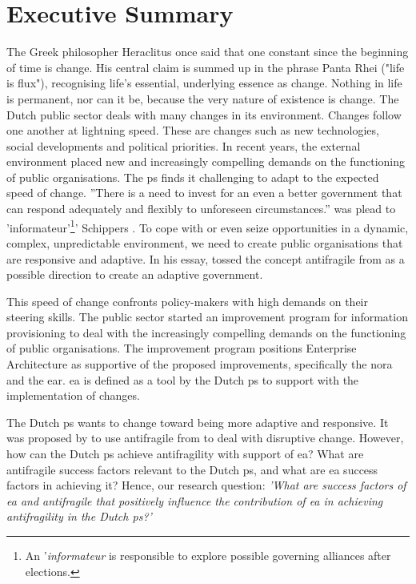 \chapter*{Executive Summary}
\label{executivesummary}
The Greek philosopher Heraclitus once said that one constant since the beginning of time is change. His central claim is summed up in the phrase Panta Rhei ("life is flux"), recognising life's essential, underlying essence as change. Nothing in life is permanent, nor can it be, because the very nature of existence is change. The Dutch public sector deals with many changes in its environment. Changes follow one another at lightning speed. These are changes such as new technologies, social developments and political priorities. In recent years, the external environment placed new and increasingly compelling demands on the functioning of public organisations. The \gls{ps} finds it challenging to adapt to the expected speed of change. ''There is a need to invest for an even a better government that can respond adequately and flexibly to unforeseen circumstances.'' was plead to 'informateur'\footnote{An '\textit{informateur} is responsible to explore possible governing alliances after elections.}' Schippers \parencite{Secretarissen-generaal2018}. To cope with or even seize opportunities in a dynamic, complex, unpredictable environment, we need to create public organisations that are responsive and adaptive. In his essay, \textcite[p.~79]{Steen2018} tossed the concept \gls{antifragile} from \textcite{Taleb2012} as a possible direction to create an adaptive government.

This speed of change confronts policy-makers with high demands on their steering skills. The public sector started an improvement program for information provisioning to deal with the increasingly compelling demands on the functioning of public organisations. The improvement program positions Enterprise Architecture as supportive of the proposed improvements, specifically the \acrfull{nora} and the \acrfull{ear}. \gls{ea} is defined as a tool by the Dutch \gls{ps} to support with the implementation of changes.

The Dutch \gls{ps} wants to change toward being more adaptive and responsive. It was proposed by \textcite{Steen2018} to use \gls{antifragile} from \textcite{Taleb2012} to deal with disruptive change.  However, how can the Dutch \gls{ps} achieve \gls{antifragility} with support of \gls{ea}? What are \gls{antifragile} success factors relevant to the Dutch \gls{ps}, and what are \gls{ea} success factors in achieving it? Hence, our research question: \emph{'What are success factors of \gls{ea} and \gls{antifragile} that positively influence the contribution of \gls{ea} in achieving \gls{antifragility} in the Dutch \gls{ps}?'}

